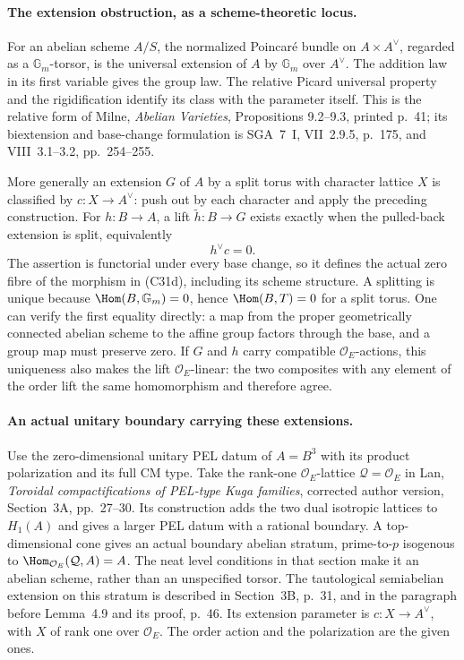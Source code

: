 \paragraph{The extension obstruction, as a scheme-theoretic locus.}
For an abelian scheme $A/S$, the normalized Poincar\'e bundle
on $A\times A^\vee$, regarded as a $\mathbb G_m$-torsor,
is the universal extension of $A$ by $\mathbb G_m$ over
$A^\vee$. The addition law in its first variable gives the
group law. The relative Picard universal property and the
rigidification identify its class with the parameter itself.
This is the relative form of Milne, \emph{Abelian Varieties},
Propositions 9.2--9.3, printed p.~41; its biextension and
base-change formulation is SGA~7~I, VII~2.9.5, p.~175,
and VIII~3.1--3.2, pp.~254--255.

More generally an extension $G$ of $A$ by a split torus with
character lattice $X$ is classified by
$c:X\to A^\vee$: push out by each character and apply the
preceding construction. For $h:B\to A$, a lift
$\widetilde h:B\to G$ exists exactly when the pulled-back
extension is split, equivalently
\[
                        h^\vee c=0.                 \tag{C31d}
\]
The assertion is functorial under every base change, so it
defines the actual zero fibre of the morphism in (C31d),
including its scheme structure. A splitting is unique because
$\Hom(B,\mathbb G_m)=0$, hence $\Hom(B,T)=0$ for a split
torus. One can verify the first equality directly: a map
from the proper geometrically connected abelian scheme to
the affine group factors through the base, and a group map
must preserve zero. If $G$ and $h$ carry compatible
$\mathcal O_E$-actions, this uniqueness also makes the lift
$\mathcal O_E$-linear: the two composites with any element
of the order lift the same homomorphism and therefore agree.

\paragraph{An actual unitary boundary carrying these extensions.}
Use the zero-dimensional unitary PEL datum of $A=B^3$ with
its product polarization and its full CM type. Take the
rank-one $\mathcal O_E$-lattice $\mathcal Q=\mathcal O_E$
in Lan, \emph{Toroidal compactifications of PEL-type Kuga
families}, corrected author version, Section~3A,
pp.~27--30. Its construction adds the two dual isotropic
lattices to $H_1(A)$ and gives a larger PEL datum with a
rational boundary. A top-dimensional cone gives an actual
boundary abelian stratum, prime-to-$p$ isogenous to
$\Hom_{\mathcal O_E}(\mathcal Q,A)=A$. The neat level
conditions in that section make it an abelian scheme,
rather than an unspecified torsor. The tautological
semiabelian extension on this stratum is described in
Section~3B, p.~31, and in the paragraph before Lemma~4.9
and its proof, p.~46. Its extension parameter is
$c:X\to A^\vee$, with $X$ of rank one over $\mathcal O_E$.
The order action and the polarization are the given ones.

